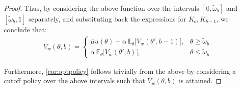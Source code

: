 \begin{proof}
    Thus, by considering the above function over the intervals $[0, \widetilde\omega_b]$ and $[\widetilde\omega_b, 1]$ separately, and substituting back the expressions for $K_b, K_{b-1}$, we conclude that:
    \begin{equation*}
    \begin{split}
        V_w(\theta,b)=\begin{cases}
            \overline\mu u(\theta) +\alpha \,\mathbb{E}_{\theta}\Big[V_w(\theta', b-1)\Big],& \theta \geq \widetilde \omega_b \\[10pt]
            \alpha \,\mathbb{E}_{\theta}\Big[V_w(\theta', b)\Big],& \theta\leq\widetilde \omega_b
        \end{cases} 
    \end{split}
    \end{equation*} 

    Furthermore, \autoref{cor:optpolicy} follows trivially from the above by considering a cutoff policy over the above intervals such that $V_w(\theta,b)$ is attained. 
\begin{comment} 
    When a woman with budget $b$ is presented a candidate with attractiveness $\theta \geq \widetilde\omega_b$ and she swipes right, her expected lifetime sum of discounted payoffs is:
    \begin{equation*}
        \begin{split}
            \overline\mu u(\theta) +\alpha \,\mathbb{E}_{\theta}\Big[V_w(\theta', b-1)\Big]\\
            = V_w(\theta,b)
        \end{split}
    \end{equation*}
    Alternatively, when presented a candidate with attractiveness $\theta<\widetilde\omega_b$ and she swipes left:
    \begin{equation*}
        \begin{split}
            \alpha \,\mathbb{E}_{\theta}\Big[V_w(\theta', b)\Big]\\
            = V_w(\theta,b)
        \end{split}
    \end{equation*} 
\end{comment}
\end{proof}

